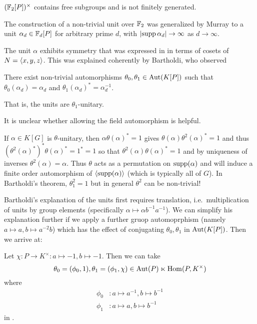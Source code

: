 \begin{corollary}
    \label{corollary:huge_group_of_units}
    $(\mathbb{F}_2[P])^\times$ contains free subgroups and is not finitely generated.
\end{corollary}

The construction of a non-trivial unit over $\mathbb{F}_2$ was generalized by Murray \cite{Murray21} to a unit $\alpha_d \in \mathbb{F}_d[P]$ for arbitrary prime $d$, with $\lvert \operatorname{supp}{\alpha_d} \rvert \to \infty$ as $d \to \infty$.

The unit $\alpha$ exhibits symmetry that was expressed in \cite{Gardam21} in terms of cosets of $N = \langle x, y, z \rangle$.
This was explained coherently by Bartholdi, who observed
\begin{theorem}
    \label{theorem:bartholdi_unit_symmetry}
    There exist non-trivial automorphisms $\theta_0, \theta_1 \in \mathrm{Aut}(K[P])$ such that $\theta_0(\alpha_d) = \alpha_d$ and $\theta_1(\alpha_d)^* = \alpha_d^{-1}$.
\end{theorem}
That is, the units are $\theta_1$-unitary.

\begin{remark}
    It is unclear whether allowing the field automorphism is helpful.
\end{remark}

\begin{remark}
    If $\alpha \in K[G]$ is $\theta$-unitary, then $\alpha \theta(\alpha)^* = 1$ gives $\theta(\alpha) \theta^2(\alpha)^* = 1$ and thus $(\theta^2(\alpha)^*)^* \theta(\alpha)^* = 1^* = 1$ so that $\theta^2(\alpha) \theta(\alpha)^* = 1$ and by uniqueness of inverses $\theta^2(\alpha) = \alpha$.
    Thus $\theta$ acts as a permutation on $\operatorname{supp}(\alpha)$ and will induce a finite order automorphism of $\langle \operatorname{supp}(\alpha) \rangle$ (which is typically all of $G$).
    In Bartholdi's theorem, $\theta_1^2 = 1$ but in general $\theta^2$ can be non-trivial!
\end{remark}

Bartholdi's explanation of the units first requires translation, i.e.\ multiplication of units by group elements (specifically $\alpha \mapsto \alpha b^{-1} a^{-1}$).
We can simplify his explanation further if we apply a further gruop automoprphism (namely $a \mapsto a, b \mapsto a^{-2} b$) which has the effect of conjugating $\theta_0, \theta_1$ in $\mathrm{Aut}(K[P])$.
Then we arrive at:

\begin{proposition}
    Let $\chi \colon P \to K^\times \colon a \mapsto -1, b \mapsto -1$.
    Then we can take \[
        \theta_0 = (\phi_0, 1), \theta_1 = (\phi_1, \chi) \in \mathrm{Aut}(P) \ltimes \mathrm{Hom}(P, K^\times)
    \] where
    \begin{align*}
        \phi_0 &\colon a \mapsto a^{-1}, b \mapsto b^{-1} \\
        \phi_1 &\colon a \mapsto a, b \mapsto b^{-1}
    \end{align*}
    in .
\end{proposition}

